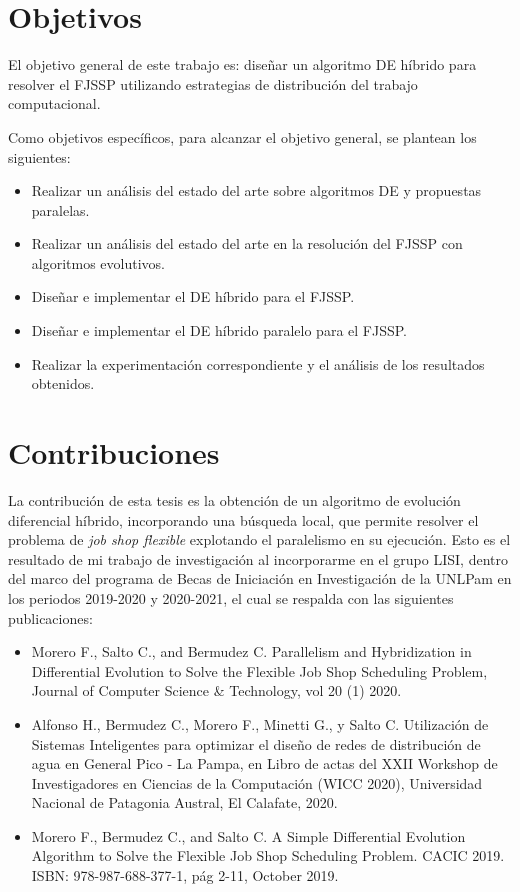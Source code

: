 \section{Objetivos}

El objetivo general de este trabajo es: diseñar un algoritmo DE híbrido para resolver el FJSSP utilizando
estrategias de distribución del trabajo computacional.


Como objetivos específicos, para alcanzar el objetivo general, se plantean los siguientes:
\begin{itemize}
    \item Realizar un análisis del estado del arte sobre algoritmos DE y propuestas paralelas.
    \item Realizar un análisis del estado del arte en la resolución del FJSSP con algoritmos evolutivos.
    \item Diseñar e implementar el DE híbrido para el FJSSP.
    \item Diseñar e implementar el DE híbrido paralelo para el FJSSP.
    \item Realizar la experimentación correspondiente y el análisis de los resultados obtenidos.
\end{itemize}

\section{Contribuciones}
La contribución de esta tesis es la obtención de un algoritmo de evolución diferencial híbrido, incorporando una búsqueda local, que permite resolver el problema de \textit{job shop flexible} explotando el paralelismo en su ejecución. Esto es el resultado de mi trabajo de investigación al incorporarme en el grupo LISI, dentro del marco del programa de Becas de Iniciación en Investigación de la UNLPam en los periodos 2019-2020 y 2020-2021, el cual se respalda con las siguientes publicaciones: 


\begin{itemize}
    \item Morero F., Salto C., and Bermudez C. Parallelism and Hybridization in Differential Evolution to Solve the Flexible Job Shop Scheduling Problem, Journal of Computer Science & Technology, vol 20 (1) 2020. 
    \item Alfonso H., Bermudez C., Morero F., Minetti G., y Salto C. Utilización de Sistemas Inteligentes para optimizar el diseño de redes de distribución de agua en General Pico - La Pampa, en Libro de actas del XXII Workshop de Investigadores en Ciencias de la Computación (WICC 2020), Universidad Nacional de Patagonia Austral, El Calafate, 2020.
    \item Morero F., Bermudez C., and Salto C. A Simple Differential Evolution Algorithm to Solve the Flexible Job Shop Scheduling Problem. CACIC 2019. ISBN: 978-987-688-377-1, pág 2-11, October 2019.
\end{itemize}


